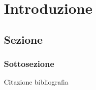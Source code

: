 \chapter{Introduzione}
\section{Sezione}
\subsection{Sottosezione}

Citazione bibliografia \cite{ec2web}